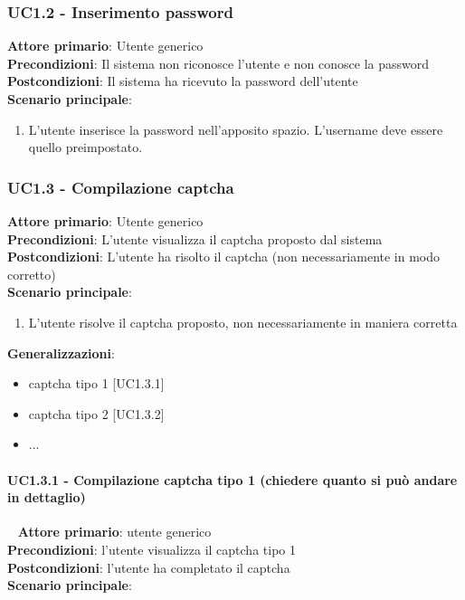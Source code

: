 \subsubsection{UC1.2 - Inserimento password}
\textbf{Attore primario}: Utente generico\\
\textbf{Precondizioni}: Il sistema non riconosce l'utente e non conosce la password\\
\textbf{Postcondizioni}: Il sistema ha ricevuto la password dell'utente\\
\textbf{Scenario principale}:
\begin{enumerate}
   \item L'utente inserisce la password nell'apposito spazio. L'username deve essere quello preimpostato.
\end{enumerate}

\subsubsection{UC1.3 - Compilazione captcha}
\textbf{Attore primario}: Utente generico\\
\textbf{Precondizioni}: L'utente visualizza il captcha proposto dal sistema\\
\textbf{Postcondizioni}: L'utente ha risolto il captcha (non necessariamente in modo corretto)\\
\textbf{Scenario principale}:
\begin{enumerate}
   \item L'utente risolve il captcha proposto, non necessariamente in maniera corretta
\end{enumerate}
\textbf{Generalizzazioni}:
\begin{itemize}
   \item captcha tipo 1 [UC1.3.1]
   \item captcha tipo 2 [UC1.3.2]
   \item ...
\end{itemize}

\paragraph{UC1.3.1 - Compilazione captcha tipo 1 (chiedere quanto si può andare in dettaglio)}~\smallskip
\textbf{Attore primario}: utente generico\\
\textbf{Precondizioni}: l'utente visualizza il captcha tipo 1\\
\textbf{Postcondizioni}: l'utente ha completato il captcha\\
\textbf{Scenario principale}:

